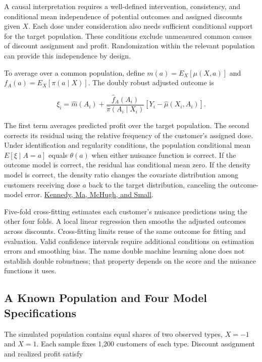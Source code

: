 A causal interpretation requires a well-defined intervention,
consistency, and conditional mean independence of potential outcomes and
assigned discounts given \(X\). Each dose under consideration also needs
sufficient conditional support for the target population. These
conditions exclude unmeasured common causes of discount assignment and
profit. Randomization within the relevant population can provide this
independence by design.

To average over a common population, define \(m(a)=E_X[\mu(X,a)]\) and
\(f_A(a)=E_X[\pi(a\mid X)]\). The doubly robust adjusted outcome is

\[
\xi_i=\widehat m(A_i)+\frac{\widehat f_A(A_i)}{\widehat\pi(A_i\mid X_i)}
\left[Y_i-\widehat\mu(X_i,A_i)\right].
\]

The first term averages predicted profit over the target population. The
second corrects its residual using the relative frequency of the
customer's assigned dose. Under identification and regularity
conditions, the population conditional mean \(E[\xi\mid A=a]\) equals
\(\theta(a)\) when either nuisance function is correct. If the outcome
model is correct, the residual has conditional mean zero. If the density
model is correct, the density ratio changes the covariate distribution
among customers receiving dose \(a\) back to the target distribution,
canceling the outcome-model error.
\href{https://arxiv.org/abs/1507.00747}{Kennedy, Ma, McHugh, and Small}.

Five-fold cross-fitting estimates each customer's nuisance predictions
using the other four folds. A local linear regression then smooths the
adjusted outcomes across discounts. Cross-fitting limits reuse of the
same outcome for fitting and evaluation. Valid confidence intervals
require additional conditions on estimation errors and smoothing bias.
The name double machine learning alone does not establish double
robustness; that property depends on the score and the nuisance
functions it uses.

\hypertarget{M06-a-known-population-and-four-model-specifications}{%
\subsection{A Known Population and Four Model
Specifications}\label{M06-a-known-population-and-four-model-specifications}}

\noindent \noindent The simulated population contains equal shares of two observed
types, \(X=-1\) and \(X=1\). Each sample fixes 1,200 customers of each
type. Discount assignment and realized profit satisfy

